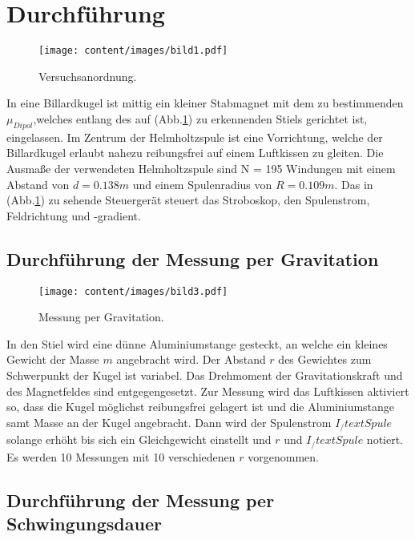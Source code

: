 \newpage

\section{Durchführung}
\label{sec:Durchführung}

\begin{figure}
  \centering
  \texttt{[image: content/images/bild1.pdf]}
  \caption{Versuchsanordnung.}
  \label{fig:1}
\end{figure}

In eine Billardkugel ist mittig ein kleiner Stabmagnet mit
dem zu bestimmenden $\mu_{Dipol}$,welches entlang
des auf (Abb.\ref{fig:1}) zu erkennenden Stiels
gerichtet ist, eingelassen. Im Zentrum der Helmholtzspule
ist eine Vorrichtung, welche der Billardkugel erlaubt nahezu
reibungsfrei auf einem Luftkissen zu gleiten.
Die Ausmaße der verwendeten Helmholtzspule sind N = 195 Windungen mit
einem Abstand von $d = 0.138m$ und einem Spulenradius von $R = 0.109m$.
Das in (Abb.\ref{fig:1}) zu sehende Steuergerät steuert das Stroboskop, den Spulenstrom,
 Feldrichtung und -gradient.


 \subsection{Durchführung der Messung per Gravitation}
 \label{ssec:DurchGrav}

 \begin{figure}
   \centering
   \texttt{[image: content/images/bild3.pdf]}
   \caption{Messung per Gravitation.}
   \label{fig:2}
 \end{figure}

In den Stiel wird eine dünne Aluminiumstange
gesteckt, an welche ein kleines Gewicht der Masse $m$ angebracht wird.
Der Abstand $r$ des Gewichtes zum Schwerpunkt der Kugel ist variabel.
Das Drehmoment der Gravitationskraft und des Magnetfeldes sind entgegengesetzt.
Zur Messung wird das Luftkissen aktiviert so, dass die Kugel möglichst
reibungsfrei gelagert ist und die Aluminiumstange samt Masse an der Kugel angebracht.
Dann wird der Spulenstrom $I_/text{Spule}$ solange erhöht bis sich ein Gleichgewicht einstellt und
$r$ und $I_/text{Spule}$ notiert. Es werden 10 Messungen mit 10 verschiedenen $r$ vorgenommen.


\subsection{Durchführung der Messung per Schwingungsdauer}
\label{ssec:DurchSchw}
